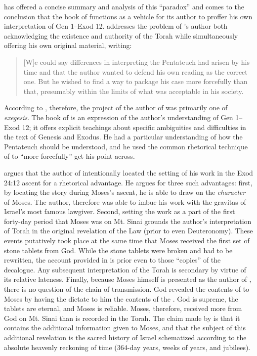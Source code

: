 \vanderkam has offered a concise summary and analysis of this ``\psgraphical paradox'' and comes to the conclusion that the book of \jub functions as a vehicle for its author to proffer his own interpretation of Gen 1--Exod 12. \vanderkam addresses the problem of \jub's author both acknowledging the existence and authority of the Torah while simultaneously offering his own original material, writing:

\begin{quote}
    [W]e could say differences in interpreting the Pentateuch had arisen by his time and that the author wanted to defend his own reading as the correct one. But he wished to find a way to package his case more forcefully than that, presumably within the limits of what was acceptable in his society.\autocite[28]{vanderkam_metso-etal2010}
\end{quote}

\noindent
According to \vanderkam, therefore, the project of the author of \jub was primarily one of \emph{exegesis}. The book of \jub is an expression of the author's understanding of Gen 1--Exod 12; it offers explicit teachings about specific ambiguities and difficulties in the text of Genesis and Exodus. He had a particular understanding of how the Pentateuch should be understood, and he used the common rhetorical technique of \psy to ``more forcefully'' get his point across.%
    \autocite[28]{vanderkam_metso-etal2010}

\vanderkam argues that the author of \jub intentionally located the setting of his work in the Exod 24:12 ascent for a rhetorical advantage. He argues for three such advantages: first, by locating the story during Moses's ascent, he is able to draw on the \emph{character} of Moses. The author, therefore was able to imbue his work with the gravitas of Israel's most famous lawgiver. Second, setting the work as a part of the first forty-day period that Moses was on Mt. Sinai grounds the author's interpretation of Torah in the original revelation of the Law (prior to even Deuteronomy). These events putatively took place at the same time that Moses received the first set of stone tablets from God. While the stone tablets were broken and had to be rewritten, the account provided in \jub is prior even to those ``copies'' of the decalogue. Any subsequent interpretation of the Torah is secondary by virtue of its relative lateness. Finally, because Moses himself is presented as the author of \jub, there is no question of the chain of transmission. God revealed the contents of \jub to Moses by having the \ap dictate to him the contents of the \heavenlytablets. God is supreme, the tablets are eternal, and Moses is reliable. Moses, therefore, received more from God on Mt. Sinai than is recorded in the Torah. The claim made by \jub is that it contains the additional information given to Moses, and that the subject of this additional revelation is the sacred history of Israel schematized according to the absolute heavenly reckoning of time (364-day years, weeks of years, and jubilees).


